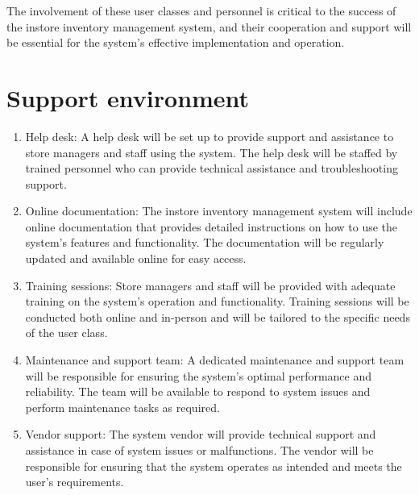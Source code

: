 The involvement of these user classes and personnel is critical to the success of the instore inventory management system, and their cooperation and support will be essential for the system's effective implementation and operation.

\section{Support environment \label{Section::Supportenvironment}}
\begin{enumerate}
    \item Help desk: A help desk will be set up to provide support and assistance to store managers and staff using the system. The help desk will be staffed by trained personnel who can provide technical assistance and troubleshooting support.

    \item Online documentation: The instore inventory management system will include online documentation that provides detailed instructions on how to use the system's features and functionality. The documentation will be regularly updated and available online for easy access.

    \item Training sessions: Store managers and staff will be provided with adequate training on the system's operation and functionality. Training sessions will be conducted both online and in-person and will be tailored to the specific needs of the user class.

    \item Maintenance and support team: A dedicated maintenance and support team will be responsible for ensuring the system's optimal performance and reliability. The team will be available to respond to system issues and perform maintenance tasks as required.

    \item Vendor support: The system vendor will provide technical support and assistance in case of system issues or malfunctions. The vendor will be responsible for ensuring that the system operates as intended and meets the user's requirements.
    
\end{enumerate}


\newpage